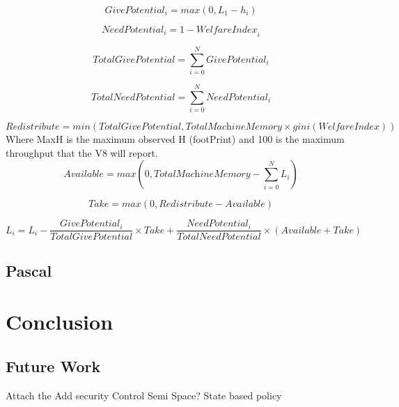\documentclass{l4proj}
\begin{document}
\begin{equation}
\textit{GivePotential}_i = max(0,L_1 - h_i)
\end{equation}

\begin{equation}
\textit{NeedPotential}_i = 1 - \textit{WelfareIndex}_i
\end{equation}

\begin{equation}
\textit{TotalGivePotential} = \sum_{i=0}^{N}\textit{GivePotential}_i
\end{equation}

\begin{equation}
\textit{TotalNeedPotential} = \sum_{i=0}^{N}\textit{NeedPotential}_i
\end{equation}

\begin{equation}
\textit{Redistribute} = min(TotalGivePotential,\textit{TotalMachineMemory} \times \textit{gini}(\textit{WelfareIndex}))
\end{equation}
Where MaxH is the maximum observed H (footPrint) and 100 is the maximum throughput that the V8 will report.
\begin{equation}
\textit{Available} = max(0,\textit{TotalMachineMemory} - \sum_{i=0}^{N}L_i)
\end{equation}

\begin{equation}
\textit{Take} = max(0,\textit{Redistribute} - \textit{Available})
\end{equation}

\begin{equation}
L_i = L_i - \frac{\textit{GivePotential}_i}{\textit{TotalGivePotential}} \times Take + \frac{\textit{NeedPotential}_i}{\textit{TotalNeedPotential}}\times (Available + Take) 
\end{equation}

\section{Pascal}
\chapter{Conclusion}
\section{Future Work}
Attach the 
Add security
Control Semi Space?
State based policy
\end{document}
